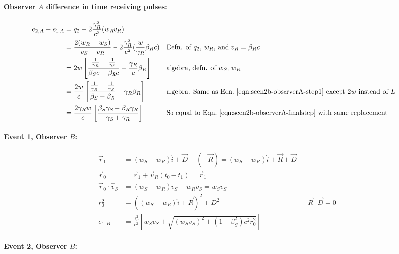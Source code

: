 \documentclass[a4paper]{article}
\theoremstyle{plain}
\theoremstyle{definition}
\newcommand{\vect}[1]{\vec{#1}}
\newcommand{\hatvec}[1]{\hat{#1}}
\newcommand{\ihat}{\hatvec{i}}
\begin{document}
\paragraph{Observer $A$ difference in time receiving pulses:}

\begin{align*}
e_{2,A} - e_{1,A}
  & = q_2 - 2\frac{\gamma_R^2}{c^2} (w_R v_R) \\
  & = \frac{2(w_R-w_S)}{v_S - v_R} - 2\frac{\gamma_R^2}{c^2} ( \frac{w}{\gamma_R} \beta_R c ) & & \text{Defn. of $q_2$, $w_R$, and $v_R = \beta_R c$} \\
  & = 2w \left[ \frac{\frac{1}{\gamma_R} - \frac{1}{\gamma_S}}{\beta_S c - \beta_R c} - \frac{\gamma_R}{c} \beta_R \right] & & \text{algebra, defn. of $w_S$, $w_R$} \\
  & = \frac{2w}{c} \left[ \frac{\frac{1}{\gamma_R} - \frac{1}{\gamma_S}}{\beta_S-\beta_R} - \gamma_R \beta_R \right] & & \text{algebra. Same as Eqn.~\eqref{eqn:scen2b-observerA-step1} except $2w$ instead of $L$} \\
  & = \frac{2\gamma_R w}{c} \left[ \frac{\beta_S\gamma_S - \beta_R\gamma_R}{\gamma_S + \gamma_R} \right] & & \text{So equal to Eqn.~\eqref{eqn:scen2b-observerA-finalstep} with same replacement}
\end{align*}


\paragraph{Event 1, Observer $B$:}

\begin{align*}
\vect{r}_1 & = (w_S - w_R)\ihat + \vect{D} - (-\vect{R}) = (w_S - w_R)\ihat + \vect{R} + \vect{D} \\
\vect{r}_0 & = \vect{r}_1 + \vect{v}_R (t_0 - t_1) = \vect{r}_1 \\
\vect{r}_0 \cdot \vect{v}_S & = (w_S - w_R)v_S + w_Rv_S = w_Sv_S \\
r_0^2 & = ((w_S-w_R)\ihat + \vect{R})^2 + D^2 & & \text{$\vect{R} \cdot \vect{D} = 0$} \\
e_{1,B} & = \frac{\gamma_S^2}{c^2} \left[ w_Sv_S + \sqrt{ (w_Sv_S)^2 + (1-\beta_S^2)c^2r_0^2 } \right]
\end{align*}


\paragraph{Event 2, Observer $B$:}
\end{document}
